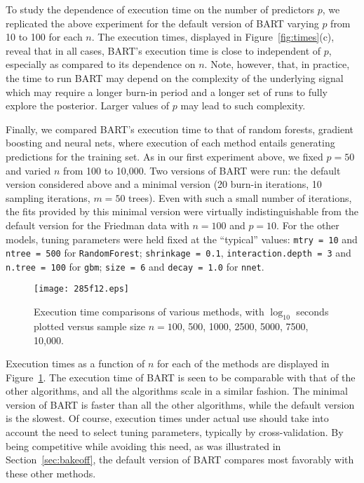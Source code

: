 \documentclass[aoas,nameyear,dvips]{arximspdf}
\begin{document}
To study the dependence of execution time on the number of predictors
$p$, we replicated the above experiment for the default version of BART
varying $p$ from 10 to 100 for each $n$.  The execution times,
displayed in Figure~\ref{fig:times}(c), reveal that in all cases,
BART's execution time is close to independent of $p$, especially as
compared to its dependence on $n$.  Note, however, that, in practice,
the time to run BART may depend on the complexity of the underlying
signal which may require a longer burn-in period  and a longer set of
runs to fully explore the posterior.  Larger values of $p$ may lead to
such complexity.

Finally, we compared BART's execution time to that of random forests,
gradient boosting and neural nets, where execution of each method
entails generating predictions for the training set.  As in our first
experiment above, we fixed $p=50$ and varied $n$ from 100 to 10,000.
Two versions of BART were run: the default version considered above and
a minimal version (20 burn-in iterations, 10 sampling iterations, $m =
50$ trees).  Even with such a small number of iterations, the fits
provided by this minimal version were virtually indistinguishable from
the default version for the Friedman data with $n=100$ and $p=10$. For
the other models, tuning parameters were held fixed at the ``typical''
values: \texttt{mtry = 10} and \texttt{ntree = 500} for
\texttt{RandomForest}; \texttt{shrinkage = 0.1},
\texttt{interaction.depth = 3} and \texttt{n.tree = 100} for
\texttt{gbm};  \texttt{size = 6} and  \texttt{decay = 1.0} for
\texttt{nnet}.

\begin{figure}[b]

\texttt{[image: 285f12.eps]}

\caption{Execution time comparisons of various methods, with $\log_{10}$ seconds plotted versus sample
size $n= 100$, 500, 1000, 2500, 5000, 7500, 10,000.}
\label{fig:compare}
\end{figure}

Execution times as a function of $n$ for each of the methods are
displayed in Figure~\ref{fig:compare}.   The execution time of BART is
seen to be comparable with that of the other algorithms, and all the
algorithms scale in a similar fashion.  The minimal version of BART is
faster than all the other algorithms, while the default version is the
slowest.  Of course,  execution times under actual use should take into
account the need to select tuning parameters, typically by
cross-validation.   By being competitive while avoiding this need, as
was illustrated in Section~\ref{sec:bakeoff}, the default version of
BART compares most favorably with these other methods.
\end{document}
